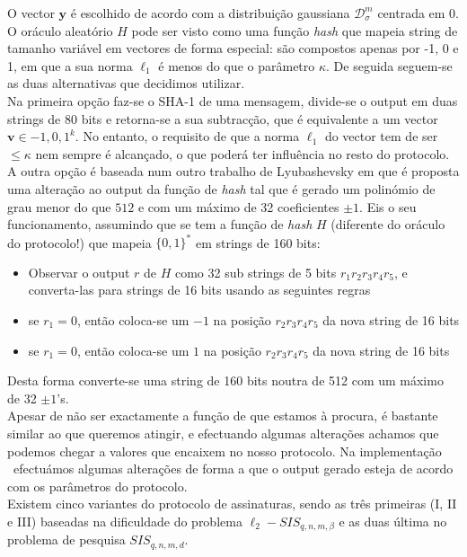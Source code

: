 O vector $\mathbf{y}$ é escolhido de acordo com a distribuição gaussiana $\mathcal{D}^m_\sigma$ centrada em 0.\\
O oráculo aleatório $H$ pode ser visto como uma função \textit{hash}  que mapeia string de tamanho variável em vectores de forma especial: são compostos apenas por -1, 0 e 1, em que a sua norma $\ell_1$ é menos do que o parâmetro $\kappa$. De seguida seguem-se as duas alternativas que decidimos utilizar.\\
%
Na primeira opção faz-se o SHA-1 de uma mensagem, divide-se o output em duas strings de 80 bits e retorna-se a sua subtracção, que é equivalente a um vector $\textbf{v} \in {-1, 0, 1}^k$. No entanto, o requisito de que a norma $\ell_1$ do vector tem de ser $\leq \kappa$ nem sempre é alcançado, o que poderá ter influência no resto do protocolo.\\
A outra opção é baseada num outro trabalho de Lyubashevsky \cite{guneysu2012practical} em que é proposta uma alteração ao output da função de \textit{hash} tal que é gerado um polinómio de grau menor do que $512$ e com um máximo de 32 coeficientes $\pm 1$. Eis o seu funcionamento, assumindo que se tem a função de \textit{hash} $H$ (diferente do oráculo do protocolo!) que mapeia $\{0,1\}^*$ em strings de 160 bits:
\begin{itemize}
  \item Observar o output $r$ de $H$ como 32 sub strings de 5 bits $r_1 r_2 r_3 r_4 r_5$, e converta-las para strings de 16 bits usando as seguintes regras
  \item se $r_1 = 0$, então coloca-se um $-1$ na posição $r_2 r_3 r_4 r_5$ da nova string de 16 bits
  \item se $r_1 = 0$, então coloca-se um $1$ na posição $r_2 r_3 r_4 r_5$ da nova string de 16 bits
\end{itemize}
Desta forma converte-se uma string de 160 bits noutra de 512 com um máximo de 32 $\pm 1$'s.\\
Apesar de não ser exactamente a função de que estamos à procura, é bastante similar ao que queremos atingir, e efectuando algumas alterações achamos que podemos chegar a valores que encaixem no nosso protocolo. Na implementação \sage\ efectuámos algumas alterações de forma a que o output gerado esteja de acordo com os parâmetros do protocolo.\\
Existem cinco variantes do protocolo de assinaturas, sendo as três primeiras (I, II e III) baseadas na dificuldade do problema $\ell_2-SIS_{q, n, m, \beta}$ e as duas última no problema de pesquisa $SIS_{q, n, m, d}$.